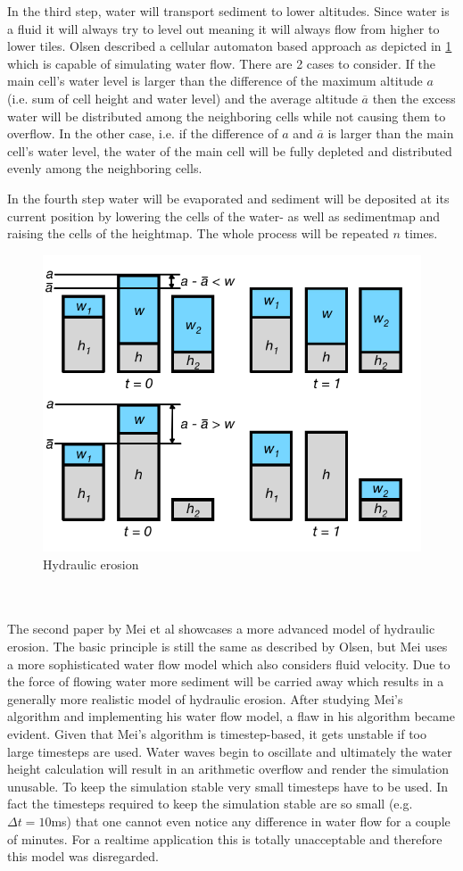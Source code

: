 \documentclass[11pt,a4paper,twoside,openright]{report}
\begin{document}
In the third step, water will transport sediment to lower altitudes. Since water is a fluid it will always try to level out meaning it will always flow from higher to lower tiles. Olsen described a cellular automaton based approach as depicted in \cref{fig:hydrolicerosion} which is capable of simulating water flow. There are 2 cases to consider. If the main cell's water level is larger than the difference of the maximum altitude $a$ (i.e. sum of cell height and water level) and the average altitude $\overline{a}$ then the excess water will be distributed among the neighboring cells while not causing them to overflow. In the other case, i.e. if the difference of $a$ and $\overline{a}$ is larger than the main cell's water level, the water of the main cell will be fully depleted and distributed evenly among the neighboring cells.

In the fourth step water will be evaporated and sediment will be deposited at its current position by lowering the cells of the water- as well as sedimentmap and raising the cells of the heightmap. The whole process will be repeated $n$ times.
\begin{figure}[h]
\centering
\includegraphics[width=0.65\linewidth]{hydraulicerosion.png}
\caption{Hydraulic erosion}\label{fig:hydrolicerosion}
\end{figure}
\\
\\
The second paper \cite{mei:inria-00402079} by Mei et al showcases a more advanced model of hydraulic erosion. The basic principle is still the same as described by Olsen, but Mei uses a more sophisticated water flow model which also considers fluid velocity. Due to the force of flowing water more sediment will be carried away which results in a generally more realistic model of hydraulic erosion. After studying Mei's algorithm and implementing his water flow model, a flaw in his algorithm became evident. Given that Mei's algorithm is timestep-based, it gets unstable if too large timesteps are used. Water waves begin to oscillate and ultimately the water height calculation will result in an arithmetic overflow and render the simulation unusable. To keep the simulation stable very small timesteps have to be used. In fact the timesteps required to keep the simulation stable are so small (e.g. $\Delta t = 10$ms) that one cannot even notice any difference in water flow for a couple of minutes. For a realtime application this is totally unacceptable and therefore this model was disregarded.
\end{document}
